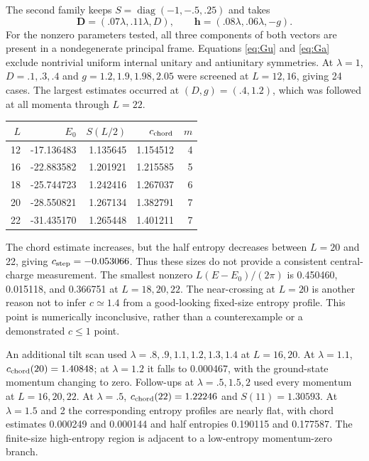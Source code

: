\documentclass[11pt]{article}
\newcommand{\DD}{\boldsymbol D}
\newcommand{\hh}{\boldsymbol h}
\begin{document}
The second family keeps $S=\operatorname{diag}(-1,-.5,.25)$ and takes
\begin{equation}
 \DD=(.07\lambda,.11\lambda,D),\qquad
 \hh=(.08\lambda,.06\lambda,-g). \label{eq:genericnum}
\end{equation}
For the nonzero parameters tested, all three components of both vectors
are present in a nondegenerate principal frame. Equations \eqref{eq:Gu} and
\eqref{eq:Ga} exclude nontrivial uniform internal unitary and antiunitary
symmetries. At $\lambda=1$, $D=.1,.3,.4$ and $g=1.2,1.9,1.98,2.05$ were
screened at $L=12,16$, giving 24 cases. The largest estimates occurred at
$(D,g)=(.4,1.2)$, which was followed at all momenta through $L=22$.

\begin{center}
\begin{tabular}{rrrrr}
\toprule
$L$ & $E_0$ & $S(L/2)$ & $c_{\rm chord}$ & $m$\\
\midrule
12 & -17.136483 & 1.135645 & 1.154512 & 4\\
16 & -22.883582 & 1.201921 & 1.215585 & 5\\
18 & -25.744723 & 1.242416 & 1.267037 & 6\\
20 & -28.550821 & 1.267134 & 1.382791 & 7\\
22 & -31.435170 & 1.265448 & 1.401211 & 7\\
\bottomrule
\end{tabular}
\end{center}
The chord estimate increases, but the half entropy decreases between
$L=20$ and 22, giving $c_{\rm step}=-0.053066$. Thus these sizes do not
provide a consistent central-charge measurement. The smallest nonzero
$L(E-E_0)/(2\pi)$ is 0.450460, 0.015118, and 0.366751 at $L=18,20,22$.
The near-crossing at $L=20$ is another reason not to infer $c\simeq1.4$
from a good-looking fixed-size entropy profile. This point is numerically
inconclusive, rather than a counterexample or a demonstrated $c\le1$ point.

An additional tilt scan used $\lambda=.8,.9,1.1,1.2,1.3,1.4$ at $L=16,20$.
At $\lambda=1.1$, $c_{\rm chord}(20)=1.40848$; at $\lambda=1.2$ it falls to
0.000467, with the ground-state momentum changing to zero. Follow-ups at
$\lambda=.5,1.5,2$ used every momentum at $L=16,20,22$. At $\lambda=.5$,
$c_{\rm chord}(22)=1.22246$ and $S(11)=1.30593$. At $\lambda=1.5$ and 2
the corresponding entropy profiles are nearly flat, with chord estimates
0.000249 and 0.000144 and half entropies 0.190115 and 0.177587. The finite-size
high-entropy region is adjacent to a low-entropy momentum-zero branch.
\end{document}

